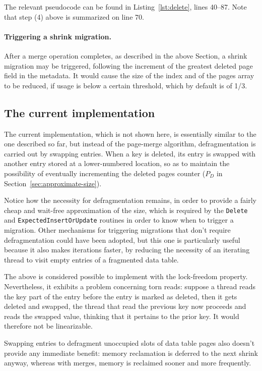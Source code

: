 The relevant pseudocode can be found in Listing~\ref{lst:delete}, lines 40--87.
Note that step (4) above is summarized on line 70.

\paragraph{Triggering a shrink migration.}
After a merge operation completes, as described in the above Section, a shrink migration may be triggered, following the increment of the greatest deleted page field in the metadata.
It would cause the size of the index and of the pages array to be reduced, if usage is below a certain threshold, which by default is of 1/3.

\subsection{The current implementation}\label{subsec:the-current-implementation}

The current implementation, which is not shown here, is essentially similar to the one described so far, but instead of the page-merge algorithm, defragmentation is carried out by swapping entries.
When a key is deleted, its entry is swapped with another entry stored at a lower-numbered location, so as to maintain the possibility of eventually incrementing the deleted pages counter ($P_D$ in Section~\ref{sec:approximate-size}).

Notice how the necessity for defragmentation remains, in order to provide a fairly cheap and wait-free approximation of the size, which is required by the \texttt{Delete} and \texttt{ExpectedInsertOrUpdate} routines in order to know when to trigger a migration.
Other mechanisms for triggering migrations that don't require defragmentation could have been adopted, but this one is particularly useful because it also makes iterations faster, by reducing the necessity of an iterating thread to visit empty entries of a fragmented data table.

The above is considered possible to implement with the lock-freedom property.
Nevertheless, it exhibits a problem concerning torn reads: suppose a thread reads the key part of the entry before the entry is marked as deleted, then it gets deleted and swapped, the thread that read the previous key now proceeds and reads the swapped value, thinking that it pertains to the prior key.
It would therefore not be linearizable.

Swapping entries to defragment unoccupied slots of data table pages also doesn't provide any immediate benefit: memory reclamation is deferred to the next shrink anyway, whereas with merges, memory is reclaimed sooner and more frequently.


